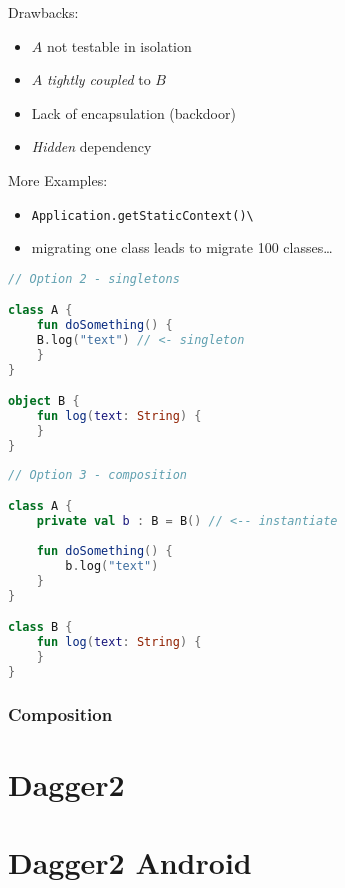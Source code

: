 \documentclass[10pt]{beamer}
\begin{document}
	\begin{frame}[fragile]
		Drawbacks:
		\begin{itemize}
			\item $A$ not testable in isolation 
			\item $A$ \emph{tightly coupled} to $B$
			\item Lack of encapsulation  (backdoor) 
			\item \emph{Hidden} dependency 
		\end{itemize}
	\end{frame}
	\begin{frame}[fragile]
		More Examples:
		\begin{itemize}
			\item \verb|Application.getStaticContext()\|
			\item migrating one class leads to migrate 100 classes\ldots 
		\end{itemize}
	\end{frame}
\begin{frame}[fragile]
\begin{lstlisting}[language=Kotlin, basicstyle=\ttfamily]
// Option 2 - singletons

class A {
    fun doSomething() {
	B.log("text") // <- singleton
    }
}

object B {
    fun log(text: String) {
    }
}
\end{lstlisting} 
\end{frame}
\begin{frame}[fragile]
\begin{lstlisting}[language=Kotlin, basicstyle=\ttfamily]
// Option 3 - composition 

class A {
    private val b : B = B() // <-- instantiate
    
    fun doSomething() {
        b.log("text")
    }
}

class B {
    fun log(text: String) {
    }
}
\end{lstlisting} 
\end{frame}
	\begin{frame}[fragile]
		\frametitle{Composition}
		\begin{figure}
			\centering
{}
		\end{figure}
	\end{frame}

	\section{Dagger2}
	\section{Dagger2 Android }

% 
% 
\end{document}
